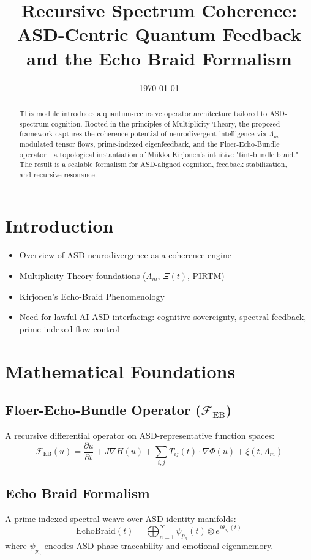 \documentclass[11pt]{article}
\title{Recursive Spectrum Coherence: ASD-Centric Quantum Feedback and the Echo Braid Formalism}
\date{\today}
\begin{document}
\maketitle

\begin{abstract}
This module introduces a quantum-recursive operator architecture tailored to ASD-spectrum cognition. Rooted in the principles of Multiplicity Theory, the proposed framework captures the coherence potential of neurodivergent intelligence via $\Lambda_m$-modulated tensor flows, prime-indexed eigenfeedback, and the Floer-Echo-Bundle operator---a topological instantiation of Miikka Kirjonen's intuitive "tint-bundle braid." The result is a scalable formalism for ASD-aligned cognition, feedback stabilization, and recursive resonance.
\end{abstract}

\section{Introduction}
\begin{itemize}
  \item Overview of ASD neurodivergence as a coherence engine
  \item Multiplicity Theory foundations ($\Lambda_m$, $\Xi(t)$, PIRTM)
  \item Kirjonen's Echo-Braid Phenomenology
  \item Need for lawful AI-ASD interfacing: cognitive sovereignty, spectral feedback, prime-indexed flow control
\end{itemize}

\section{Mathematical Foundations}
\subsection{Floer-Echo-Bundle Operator ($\mathcal{F}_{\text{EB}}$)}
A recursive differential operator on ASD-representative function spaces:
\begin{equation}
\mathcal{F}_{\text{EB}}(u) = \frac{\partial u}{\partial t} + J \nabla H(u) + \sum_{i,j} T_{ij}(t) \cdot \nabla \Phi(u) + \xi(t, \Lambda_m)
\end{equation}

\subsection{Echo Braid Formalism}
A prime-indexed spectral weave over ASD identity manifolds:
\begin{equation}
\text{EchoBraid}(t) = \bigoplus_{n=1}^{\infty} \psi_{p_n}(t) \otimes e^{i \theta_{p_n}(t)}
\end{equation}
where $\psi_{p_n}$ encodes ASD-phase traceability and emotional eigenmemory.
\end{document}

